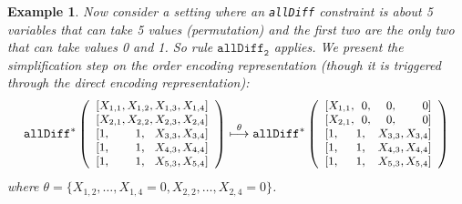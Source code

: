 \documentclass{tlp}
\newtheorem{example}[theorem]{Example}
\begin{document}
\begin{example}
Now consider a setting where an \texttt{allDiff} constraint is about 5
variables that can take 5 values (permutation) and the first two are
the only two that can take values 0 and 1. So rule
$\mathtt{allDiff_2}$ applies. We present the simplification step on
  the order encoding representation (though it is triggered through
  the direct encoding representation):
\vspace{-2mm}
\[\small
\mathtt{allDiff^*}\left( 
\begin{array}{lccr}
{[}X_{1,1},\hspace{-3mm}&X_{1,2},\hspace{-3mm}&X_{1,3},\hspace{-3mm}&X_{1,4}{]} \\
{[}X_{2,1},\hspace{-3mm}&X_{2,2},\hspace{-3mm}&X_{2,3},\hspace{-3mm}&X_{2,4}{]} \\
{[}1,\hspace{-3mm}&1,\hspace{-3mm}&X_{3,3},\hspace{-3mm}&X_{3,4}{]} \\
{[}1,\hspace{-3mm}&1,\hspace{-3mm}&X_{4,3},\hspace{-3mm}&X_{4,4}{]} \\
{[}1,\hspace{-3mm}&1,\hspace{-3mm}&X_{5,3},\hspace{-3mm}&X_{5,4}{]}
\end{array}
\right)
\overset{\theta}{\longmapsto}
\mathtt{allDiff^*}\left(
\begin{array}{lccr}
{[}X_{1,1},\hspace{-3mm}&0,\hspace{-3mm}&0,\hspace{-3mm}&0{]} \\
{[}X_{2,1},\hspace{-3mm}&0,\hspace{-3mm}&0,\hspace{-3mm}&0{]} \\
{[}1,\hspace{-0mm}&1,\hspace{-0mm}&X_{3,3},\hspace{-3mm}&X_{3,4}{]} \\
{[}1,\hspace{-0mm}&1,\hspace{-0mm}&X_{4,3},\hspace{-3mm}&X_{4,4}{]} \\
{[}1,\hspace{-0mm}&1,\hspace{-0mm}&X_{5,3},\hspace{-3mm}&X_{5,4}{]}
\end{array}
\right)
\]
  where $\theta = \{ X_{1,2},\ldots,X_{1,4} = 0 , X_{2,2},\ldots,X_{2,4} = 0\}$.


\end{example}
\end{document}
